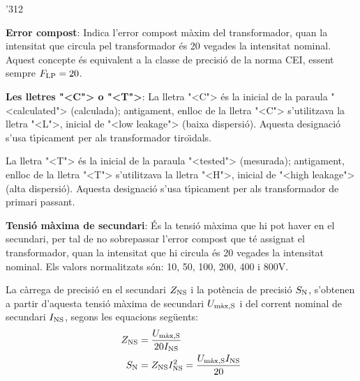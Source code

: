 \begin{dingautolist}{'312}
    \item \textbf{Error compost}: Indica l'error compost m\`{a}xim del
    transformador, quan la intensitat que circula pel
    transformador \'{e}s 20 vegades la intensitat nominal. Aquest concepte
     \'{e}s equivalent a la classe de precisi\'{o} de la norma \textsf{CEI},
     essent sempre $F_\mathrm{LP}=20$.
    \item \textbf{Les lletres {"<}C{">} o {"<}T{">}}: La lletra {"<}C{">} \'{e}s la inicial de la
    paraula  {"<}calculated{">} (calculada); antigament, enlloc de la lletra {"<}C{">}
    s'utilitzava la lletra {"<}L{">}, inicial de {"<}low leakage{">} (baixa
    dispersi\'{o}). Aquesta designaci\'{o} s'usa t\'{\i}picament per als
    transformador tiro\"{\i}dals.

    La lletra {"<}T{">} \'{e}s la inicial de la
    paraula  {"<}tested{">} (mesurada); antigament, enlloc de la lletra {"<}T{">}
    s'utilitzava la lletra {"<}H{">}, inicial de {"<}high leakage{">} (alta
    dispersi\'{o}). Aquesta designaci\'{o} s'usa t\'{\i}picament per als
    transformador de primari passant.
    \item \textbf{Tensi\'{o} m\`{a}xima de secundari}: \'{E}s la tensi\'{o} m\`{a}xima
    que hi pot haver en el secundari, per tal de no sobrepassar l'error compost que t\'{e}
    assignat el transformador, quan la intensitat que hi circula
     \'{e}s 20 vegades la intensitat nominal. Els valors
    normalitzats s\'{o}n: 10, 50, 100, 200, 400 i 800\unit{V}.

    La c\`{a}rrega de precisi\'{o} en el secundari
    $Z_\mathrm{NS}$ i la pot\`{e}ncia de precisi\'{o} $S_\mathrm{N}$, s'obtenen a partir d'aquesta
    tensi\'{o} m\`{a}xima de secundari $U_\mathrm{m\grave{a}x,S}$
    i del corrent     nominal de secundari $I_\mathrm{NS}$, segons les equacions seg\"{u}ents:
    \begin{align}
        Z_\mathrm{NS} &= \frac{U_\mathrm{m\grave{a}x,S}}{20 I_\mathrm{NS}}\\
        S_\mathrm{N} &= Z_\mathrm{NS} I_\mathrm{NS}^2 = \frac{U_\mathrm{m\grave{a}x,S} I_\mathrm{NS}}{20}
        \label{eq:sn_ti_ansi}
    \end{align}
\end{dingautolist}

